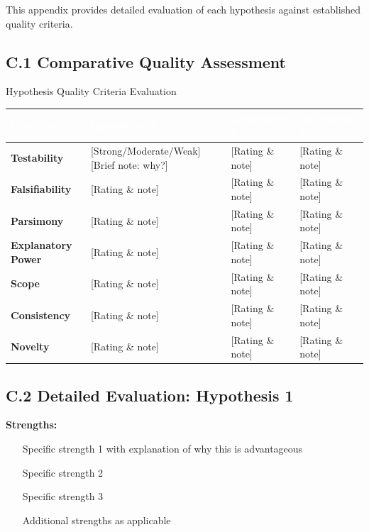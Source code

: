 \documentclass[11pt,letterpaper]{article}
\begin{document}
This appendix provides detailed evaluation of each hypothesis against established quality criteria.

\subsection*{C.1 Comparative Quality Assessment}

\begin{hypotable}{Hypothesis Quality Criteria Evaluation}
\begin{tabular}{|p{2.5cm}|p{3cm}|p{3cm}|p{3cm}|}
\hline
\tableheadercolor
\textcolor{white}{\textbf{Criterion}} & \textcolor{white}{\textbf{Hypothesis 1}} & \textcolor{white}{\textbf{Hypothesis 2}} & \textcolor{white}{\textbf{Hypothesis 3}} \\
\hline
\textbf{Testability} & [Strong/Moderate/Weak] [Brief note: why?] & [Rating \& note] & [Rating \& note] \\
\hline
\tablerowcolor
\textbf{Falsifiability} & [Rating \& note] & [Rating \& note] & [Rating \& note] \\
\hline
\textbf{Parsimony} & [Rating \& note] & [Rating \& note] & [Rating \& note] \\
\hline
\tablerowcolor
\textbf{Explanatory Power} & [Rating \& note] & [Rating \& note] & [Rating \& note] \\
\hline
\textbf{Scope} & [Rating \& note] & [Rating \& note] & [Rating \& note] \\
\hline
\tablerowcolor
\textbf{Consistency} & [Rating \& note] & [Rating \& note] & [Rating \& note] \\
\hline
\textbf{Novelty} & [Rating \& note] & [Rating \& note] & [Rating \& note] \\
\hline
\end{tabular}
\caption{Comparative assessment of hypotheses across quality criteria. Strong = meets criterion very well; Moderate = partially meets criterion; Weak = does not meet criterion well.}
\end{hypotable}

\subsection*{C.2 Detailed Evaluation: Hypothesis 1}

\textbf{Strengths:}
\begin{enumerate}
  \item [Specific strength 1 with explanation of why this is advantageous]
  \item [Specific strength 2]
  \item [Specific strength 3]
  \item [Additional strengths as applicable]
\end{enumerate}
\end{document}
